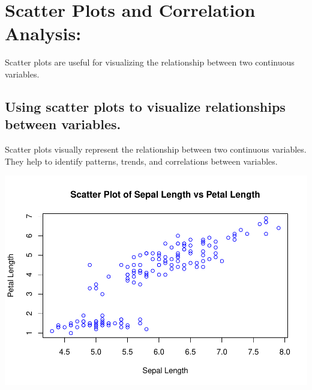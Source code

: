 \documentclass[
]{book}
\newenvironment{Shaded}{\begin{snugshade}}{\end{snugshade}}
\newcommand{\AttributeTok}[1]{\textcolor[rgb]{0.13,0.29,0.53}{#1}}
\newcommand{\CommentTok}[1]{\textcolor[rgb]{0.56,0.35,0.01}{\textit{#1}}}
\newcommand{\FunctionTok}[1]{\textcolor[rgb]{0.13,0.29,0.53}{\textbf{#1}}}
\newcommand{\NormalTok}[1]{#1}
\newcommand{\SpecialCharTok}[1]{\textcolor[rgb]{0.81,0.36,0.00}{\textbf{#1}}}
\newcommand{\StringTok}[1]{\textcolor[rgb]{0.31,0.60,0.02}{#1}}
\begin{document}
\section{Scatter Plots and Correlation Analysis:}\label{scatter-plots-and-correlation-analysis}

Scatter plots are useful for visualizing the relationship between two continuous variables.

\subsection{Using scatter plots to visualize relationships between variables.}\label{using-scatter-plots-to-visualize-relationships-between-variables.}

Scatter plots visually represent the relationship between two continuous variables. They help to identify patterns, trends, and correlations between variables.

\begin{Shaded}
\end{Shaded}

\includegraphics{_main_files/figure-latex/unnamed-chunk-72-1.pdf}
\end{document}
